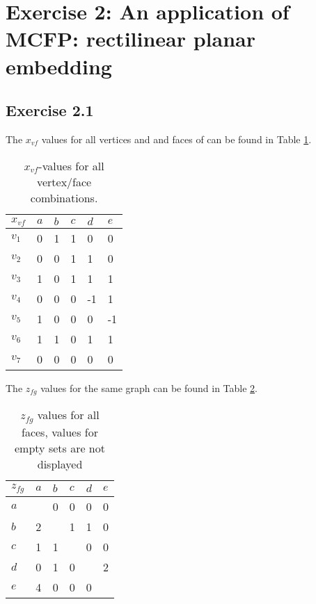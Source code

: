 \section{Exercise 2: An application of MCFP: rectilinear planar embedding}

\subsection{Exercise 2.1}

The $x_{vf}$ values for all vertices and and faces of \cite[Figure
3]{assignment1} can be found in Table \ref{table:xvf}.

\begin{table}[h]
\centering
\begin{tabular}{l|lllll}
$x_{vf}$ & $a$ & $b$ & $c$ & $d$ & $e$ \\ \hline
$v_1$   & 0   & 1   & 1   & 0   & 0   \\
$v_2$   & 0   & 0   & 1   & 1   & 0   \\
$v_3$   & 1   & 0   & 1   & 1   & 1   \\
$v_4$   & 0   & 0   & 0   & -1  & 1   \\
$v_5$   & 1   & 0   & 0   & 0   & -1  \\
$v_6$   & 1   & 1   & 0   & 1   & 1   \\
$v_7$   & 0   & 0   & 0   & 0   & 0
\end{tabular}
\caption{$x_{vf}$-values for all vertex/face combinations.}
\label{table:xvf}
\end{table}

The $z_{fg}$ values for the same graph can be found in Table \ref{table:zfg}.

\begin{table}[h]
\centering
\begin{tabular}{l|lllll}
$z_{fg}$ & $a$ & $b$ & $c$ & $d$ & $e$ \\ \hline
$a$     &    & 0   & 0   &  0  & 0   \\
$b$     & 2   &    & 1   & 1   & 0   \\
$c$     & 1   & 1   &    & 0   & 0   \\
$d$     & 0   & 1   & 0   &    & 2   \\
$e$     & 4   & 0   & 0   & 0   & 
\end{tabular}
\caption{$z_{fg}$ values for all faces, values for empty sets are not displayed}
\label{table:zfg}
\end{table}

